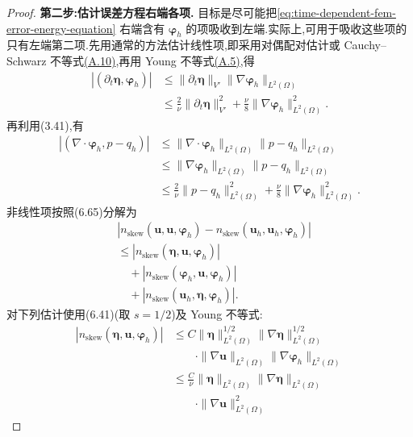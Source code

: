 \begin{theorem}
\begin{proof}
\textbf{第二步:估计误差方程右端各项.}
目标是尽可能把\cref{eq:time-dependent-fem-error-energy-equation} 右端含有 $\symbf{\varphi}_h$ 的项吸收到左端.实际上,可用于吸收这些项的只有左端第二项.先用通常的方法估计线性项,即采用对偶配对估计或 Cauchy--Schwarz 不等式\hyperref[eq:appendix-a-10]{(A.10)},再用 Young 不等式\hyperref[eq:appendix-a-5]{(A.5)},得
\[
\begin{aligned}
  |(\partial_t\symbf{\eta},\symbf{\varphi}_h)|
  &\le \|\partial_t\symbf{\eta}\|_{V'}
       \|\nabla\symbf{\varphi}_h\|_{L^2(\Omega)}\\
  &\le \frac{2}{\nu}\|\partial_t\symbf{\eta}\|_{V'}^2
       +\frac{\nu}{8}\|\nabla\symbf{\varphi}_h\|_{L^2(\Omega)}^2.
\end{aligned}
\]
再利用(3.41),有
\[
\begin{aligned}
  |(\nabla\cdot\symbf{\varphi}_h,p-q_h)|
  &\le \|\nabla\cdot\symbf{\varphi}_h\|_{L^2(\Omega)}
       \|p-q_h\|_{L^2(\Omega)}\\
  &\le \|\nabla\symbf{\varphi}_h\|_{L^2(\Omega)}
       \|p-q_h\|_{L^2(\Omega)}\\
  &\le \frac{2}{\nu}\|p-q_h\|_{L^2(\Omega)}^2
       +\frac{\nu}{8}\|\nabla\symbf{\varphi}_h\|_{L^2(\Omega)}^2.
\end{aligned}
\]
非线性项按照(6.65)分解为
\[
\begin{aligned}
&|n_{\mathrm{skew}}(\bm{u},\bm{u},\symbf{\varphi}_h)
    -n_{\mathrm{skew}}(\bm{u}_h,\bm{u}_h,\symbf{\varphi}_h)|\\
&\le |n_{\mathrm{skew}}(\symbf{\eta},\bm{u},\symbf{\varphi}_h)|\\
&\quad+|n_{\mathrm{skew}}(\symbf{\varphi}_h,\bm{u},\symbf{\varphi}_h)|\\
&\quad+|n_{\mathrm{skew}}(\bm{u}_h,\symbf{\eta},\symbf{\varphi}_h)|.
\end{aligned}
\]
对下列估计使用(6.41)(取 $s=1/2$)及 Young 不等式:
\begin{equation}\label{eq:time-dependent-fem-error-nonlinear-eta}
\begin{aligned}
  |n_{\mathrm{skew}}(\symbf{\eta},\bm{u},\symbf{\varphi}_h)|
  &\le C\|\symbf{\eta}\|_{L^2(\Omega)}^{1/2}
       \|\nabla\symbf{\eta}\|_{L^2(\Omega)}^{1/2}\\
  &\qquad\cdot\|\nabla\bm{u}\|_{L^2(\Omega)}
       \|\nabla\symbf{\varphi}_h\|_{L^2(\Omega)}\\
  &\le \frac{C}{\nu}\|\symbf{\eta}\|_{L^2(\Omega)}
       \|\nabla\symbf{\eta}\|_{L^2(\Omega)}\\
  &\qquad\cdot\|\nabla\bm{u}\|_{L^2(\Omega)}^2

\end{aligned}
\end{equation}
\end{proof}
\end{theorem}
